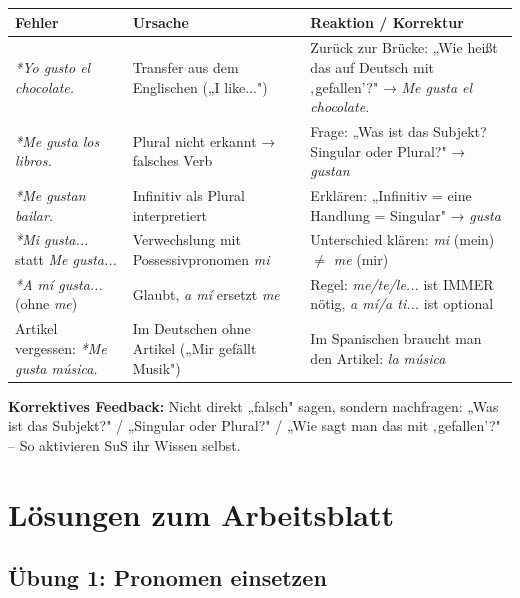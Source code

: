 \documentclass[10pt, a4paper]{article}
\newcommand{\es}[1]{\textcolor{spanisch}{\textit{#1}}}
\begin{document}
\begin{tabularx}{\textwidth}{|X|X|X|}
    \hline
    \textbf{Fehler} & \textbf{Ursache} & \textbf{Reaktion / Korrektur} \\
    \hline
    \es{*Yo gusto el chocolate.} &
    Transfer aus dem Englischen („I like...") &
    Zurück zur Brücke: „Wie heißt das auf Deutsch mit ‚gefallen'?" → \es{Me gusta el chocolate.} \\
    \hline
    \es{*Me gusta los libros.} &
    Plural nicht erkannt → falsches Verb &
    Frage: „Was ist das Subjekt? Singular oder Plural?" → \es{gustan} \\
    \hline
    \es{*Me gustan bailar.} &
    Infinitiv als Plural interpretiert &
    Erklären: „Infinitiv = eine Handlung = Singular" → \es{gusta} \\
    \hline
    \es{*Mi gusta...} statt \es{Me gusta...} &
    Verwechslung mit Possessivpronomen \es{mi} &
    Unterschied klären: \es{mi} (mein) $\neq$ \es{me} (mir) \\
    \hline
    \es{*A mí gusta...} (ohne \es{me}) &
    Glaubt, \es{a mí} ersetzt \es{me} &
    Regel: \es{me/te/le...} ist IMMER nötig, \es{a mí/a ti...} ist optional \\
    \hline
    Artikel vergessen: \es{*Me gusta música.} &
    Im Deutschen ohne Artikel („Mir gefällt Musik") &
    Im Spanischen braucht man den Artikel: \es{la música} \\
    \hline
\end{tabularx}

\vspace{6pt}

\begin{tippbox}
\textbf{Korrektives Feedback:} Nicht direkt „falsch" sagen, sondern nachfragen: „Was ist das Subjekt?" / „Singular oder Plural?" / „Wie sagt man das mit ‚gefallen'?" -- So aktivieren SuS ihr Wissen selbst.
\end{tippbox}


\section{Lösungen zum Arbeitsblatt}

\subsection*{Übung 1: Pronomen einsetzen}
\end{document}

